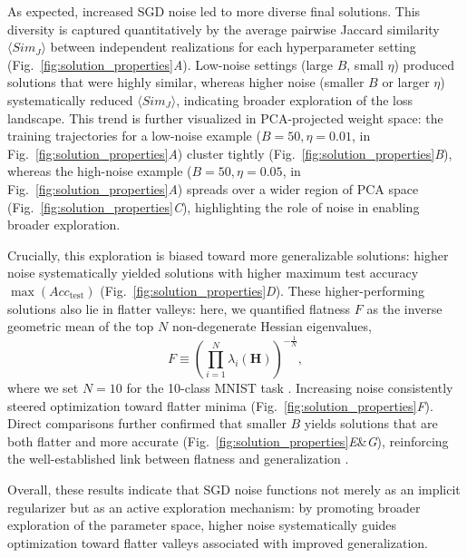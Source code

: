 \documentclass[aps,prx,reprint,superscriptaddress,longbibliography,nofootinbib,floatfix]{revtex4-2}
\begin{document}
As expected, increased SGD noise led to more diverse final solutions. This diversity is captured quantitatively by the average pairwise Jaccard similarity $\langle Sim_J \rangle$ between independent realizations for each hyperparameter setting (Fig.~\ref{fig:solution_properties}\textit{A}). Low-noise settings (large $B$, small $\eta$) produced solutions that were highly similar, whereas higher noise (smaller $B$ or larger $\eta$) systematically reduced $\langle Sim_J \rangle$, indicating broader exploration of the loss landscape. This trend is further visualized in PCA-projected weight space: the training trajectories for a low-noise example ($B=50, \eta=0.01$,  in Fig.~\ref{fig:solution_properties}\textit{A}) cluster tightly (Fig.~\ref{fig:solution_properties}\textit{B}), whereas the high-noise example ($B=50, \eta=0.05$,  in Fig.~\ref{fig:solution_properties}\textit{A}) spreads over a wider region of PCA space (Fig.~\ref{fig:solution_properties}\textit{C}), highlighting the role of noise in enabling broader exploration.

Crucially, this exploration is biased toward more generalizable solutions: higher noise systematically yielded solutions with higher maximum test accuracy $\max(Acc_\mathrm{test})$ (Fig.~\ref{fig:solution_properties}\textit{D}). These higher-performing solutions also lie in flatter valleys: here, we quantified flatness $F$ as the inverse geometric mean of the top $N$ non-degenerate Hessian eigenvalues,
\begin{equation}
F \equiv \left( \prod_{i=1}^{N} \lambda_i(\mathbf{H}) \right)^{-\tfrac{1}{N}},
\end{equation}
where we set $N=10$ for the 10-class MNIST task \cite{sagunEmpiricalAnalysisHessian2018a}. Increasing noise consistently steered optimization toward flatter minima (Fig.~\ref{fig:solution_properties}\textit{F}). Direct comparisons further confirmed that smaller $B$ yields solutions that are both flatter and more accurate (Fig.~\ref{fig:solution_properties}\textit{E}\&\textit{G}), reinforcing the well-established link between flatness and generalization \cite{hochreiterFlatMinima1997,liVisualizingLossLandscape2018,jastrzebskiThreeFactorsInfluencing2018,wuHowSGDSelects2018,keskarLargeBatchTrainingDeep2017,chenSimpleConnectionLoss2024}. 


Overall, these results indicate that SGD noise functions not merely as an implicit regularizer but as an active exploration mechanism: by promoting broader exploration of the parameter space, higher noise systematically guides optimization toward flatter valleys associated with improved generalization.
\end{document}
